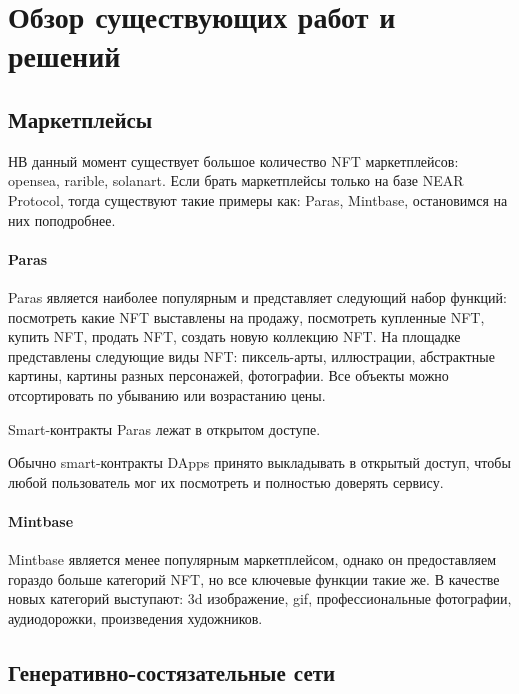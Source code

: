\section{Обзор существующих работ и решений}
\subsection{Маркетплейсы}
НВ данный момент существует большое количество NFT маркетплейсов: opensea\cite{opensea}, rarible\cite{rarible}, solanart\cite{solanart}. Если брать маркетплейсы только на базе NEAR Protocol, тогда существуют такие примеры как: Paras\cite{paras}, Mintbase\cite{mintbase}, остановимся на них поподробнее.

\paragraph{Paras}

Paras является наиболее популярным и представляет следующий набор функций:
посмотреть какие NFT выставлены на продажу, посмотреть купленные NFT, купить NFT, продать NFT, создать новую коллекцию NFT.
На площадке представлены следующие виды NFT: пиксель-арты, иллюстрации, абстрактные картины, картины разных персонажей, фотографии. Все объекты можно отсортировать по убыванию или возрастанию цены.

Smart-контракты Paras лежат в открытом доступе.

\begin{remark}
    Обычно smart-контракты DApps принято выкладывать в открытый доступ, чтобы любой пользователь мог их посмотреть и полностью доверять сервису.
\end{remark}


\paragraph{Mintbase}

Mintbase является менее популярным маркетплейсом, однако он предоставляем гораздо больше категорий NFT, но все ключевые функции такие же. В качестве
новых категорий выступают: 3d изображение, gif, профессиональные фотографии, аудиодорожки, произведения художников.

\subsection{Генеративно-состязательные сети}
